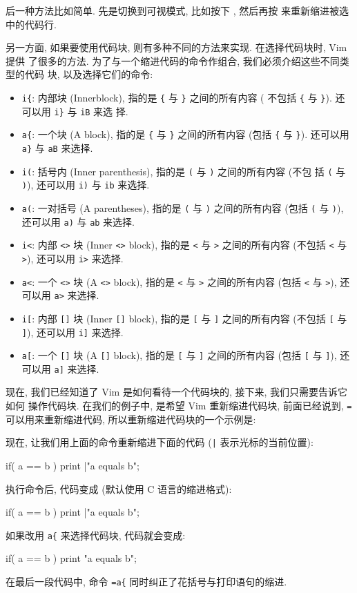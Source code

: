 后一种方法比如简单. 先是切换到可视模式, 比如按下 , 然后再按
\key{=} 来重新缩进被选中的代码行.

另一方面, 如果要使用代码块, 则有多种不同的方法来实现. 在选择代码块时, Vim 提供
了很多的方法. 为了与一个缩进代码的命令作组合, 我们必须介绍这些不同类型的代码
块, 以及选择它们的命令:

\begin{itemize}
    \item \verb'i{': 内部块 (Innerblock), 指的是 \verb'{' 与 \verb'}'
        之间的所有内容 (
        不包括 \verb'{' 与 \verb'}'). 还可以用 \verb'i}' 与 \texttt{iB} 来选
        择.
    \item \verb'a{': 一个块 (A block), 指的是 \verb'{' 与 \verb'}'
        之间的所有内容 (包括
        \verb'{' 与 \verb'}'). 还可以用 \verb'a}' 与 \verb'aB' 来选择.
    \item \verb'i(': 括号内 (Inner parenthesis), 指的是 \verb'(' 与 \verb')'
        之间的所有内容 (不包
        括 \verb'(' 与 \verb')'), 还可以用 \verb'i)' 与 \verb'ib' 来选择.
    \item \verb'a(': 一对括号 (A parentheses), 指的是 \verb'(' 与 \verb')'
        之间的所有内容 (包括 \verb'(' 与 \verb')'), 还可以用 \verb'a)' 与
        \verb'ab' 来选择.
    \item \verb'i<': 内部 \verb'<>' 块 (Inner \verb'<>' block), 指的是
        \verb'<' 与 \verb'>'
        之间的所有内容 (不包括 \verb'<' 与 \verb'>'), 还可以用 \verb'i>'
        来选择.
    \item \verb'a<': 一个 \verb'<>' 块 (A \verb'<>' block), 指的是
        \verb'<' 与 \verb'>'
        之间的所有内容 (包括 \verb'<' 与 \verb'>'), 还可以用 \verb'a>'
        来选择.
    \item \verb'i[': 内部 \verb'[]' 块 (Inner \verb'[]' block), 指的是
        \verb'[' 与 \verb']'
        之间的所有内容 (不包括 \verb'[' 与 \verb']'), 还可以用 \verb'i]'
        来选择.
    \item \verb'a[': 一个 \verb'[]' 块 (A \verb'[]' block), 指的是
        \verb'[' 与 \verb']'
        之间的所有内容 (包括 \verb'[' 与 \verb']'), 还可以用 \verb'a]'
        来选择.
\end{itemize}

现在, 我们已经知道了 Vim 是如何看待一个代码块的, 接下来, 我们只需要告诉它如何
操作代码块. 在我们的例子中, 是希望 Vim 重新缩进代码块, 前面已经说到,
\texttt{=} 可以用来重新缩进代码, 所以重新缩进代码块的一个示例是:
\begin{vimcode}
=i{
\end{vimcode}
现在, 让我们用上面的命令重新缩进下面的代码 (\verb'|' 表示光标的当前位置):
\begin{vimcode}
if( a == b )
  {
    print |"a equals b";
  }
\end{vimcode}
执行命令后, 代码变成 (默认使用 C 语言的缩进格式):
\begin{vimcode}
if( a == b )
  {
    print |"a equals b";
  }
\end{vimcode}
如果改用 \verb'a{' 来选择代码块, 代码就会变成:
\begin{vimcode}
if( a == b )
  {
    print "a equals b";
  }
\end{vimcode}
在最后一段代码中, 命令 \verb'=a{' 同时纠正了花括号与打印语句的缩进.

